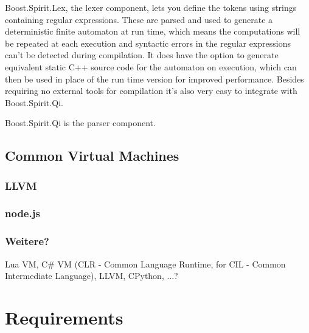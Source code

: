 			Boost.Spirit.Lex, the lexer component, lets you define the tokens using strings containing regular expressions. These are parsed and used to generate a deterministic finite automaton at run time, which means the computations will be repeated at each execution and syntactic errors in the regular expressions can't be detected during compilation. It does have the option to generate equivalent static C++ source code for the automaton on execution, which can then be used in place of the run time version for improved performance. Besides requiring no external tools for compilation it's also very easy to integrate with Boost.Spirit.Qi.
			
			Boost.Spirit.Qi is the parser component.
			

    \section{Common Virtual Machines}
        
        
        \subsection{LLVM}
        
        \subsection{node.js}
        
        
        \subsection{Weitere?}
        
        Lua VM, C\# VM (CLR - Common Language Runtime, for CIL - Common Intermediate Language), LLVM, CPython, ...?

\chapter{Requirements}

	

